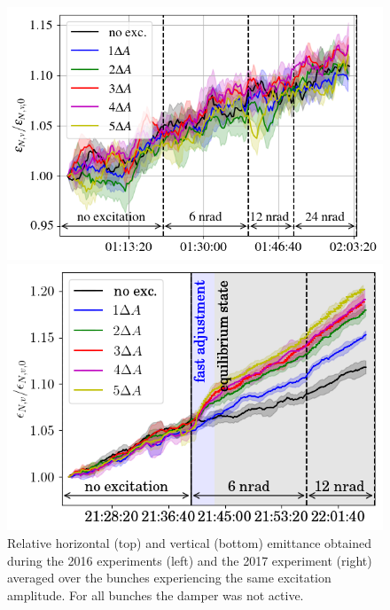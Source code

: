 \documentclass[%
 reprint,
 amsmath,amssymb,
 aps,
prstab,
]{revtex4-1}
\begin{document}
\begin{figure}[h]
\begin{minipage}[t]{0.49\linewidth}
	\end{minipage}	
	\begin{minipage}[t]{0.49\linewidth}
		\centering
		\includegraphics[width=1.0\linewidth]{2016_emitv_avg_rel_h7th_no_damper.png}
	\end{minipage}	
	\begin{minipage}[t]{0.49\linewidth}
		\centering
		\includegraphics[width=1.0\linewidth]{2017_emitv_avg_rel_hv7th_no_damper.png}
	\end{minipage}	
	\caption{\label{fig:7thexp} Relative horizontal (top) and vertical (bottom) emittance obtained during the 2016 experiments (left) and the 2017 experiment (right) averaged over the bunches experiencing the same excitation amplitude. For all bunches the damper was not active.}
\end{figure}
\end{document}
